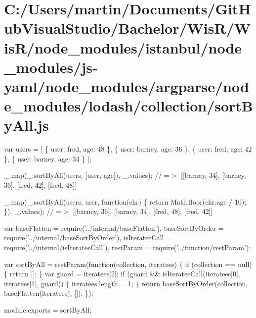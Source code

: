 \hypertarget{_c_1_2_users_2martin_2_documents_2_git_hub_visual_studio_2_bachelor_2_wis_r_2_wis_r_2node_module1c880301cba87cbea557285ccdc2d1a8}{}\section{C\+:/\+Users/martin/\+Documents/\+Git\+Hub\+Visual\+Studio/\+Bachelor/\+Wis\+R/\+Wis\+R/node\+\_\+modules/istanbul/node\+\_\+modules/js-\/yaml/node\+\_\+modules/argparse/node\+\_\+modules/lodash/collection/sort\+By\+All.\+js}
var users = \mbox{[} \{ \textquotesingle{}user\textquotesingle{}\+: \textquotesingle{}fred\textquotesingle{}, \textquotesingle{}age\textquotesingle{}\+: 48 \}, \{ \textquotesingle{}user\textquotesingle{}\+: \textquotesingle{}barney\textquotesingle{}, \textquotesingle{}age\textquotesingle{}\+: 36 \}, \{ \textquotesingle{}user\textquotesingle{}\+: \textquotesingle{}fred\textquotesingle{}, \textquotesingle{}age\textquotesingle{}\+: 42 \}, \{ \textquotesingle{}user\textquotesingle{}\+: \textquotesingle{}barney\textquotesingle{}, \textquotesingle{}age\textquotesingle{}\+: 34 \} \mbox{]};

\+\_\+.\+map(\+\_\+.\+sort\+By\+All(users, \mbox{[}\textquotesingle{}user\textquotesingle{}, \textquotesingle{}age\textquotesingle{}\mbox{]}), \+\_\+.\+values); // =$>$ \mbox{[}\mbox{[}\textquotesingle{}barney\textquotesingle{}, 34\mbox{]}, \mbox{[}\textquotesingle{}barney\textquotesingle{}, 36\mbox{]}, \mbox{[}\textquotesingle{}fred\textquotesingle{}, 42\mbox{]}, \mbox{[}\textquotesingle{}fred\textquotesingle{}, 48\mbox{]}\mbox{]}

\+\_\+.\+map(\+\_\+.\+sort\+By\+All(users, \textquotesingle{}user\textquotesingle{}, function(chr) \{ return Math.\+floor(chr.\+age / 10); \}), \+\_\+.\+values); // =$>$ \mbox{[}\mbox{[}\textquotesingle{}barney\textquotesingle{}, 36\mbox{]}, \mbox{[}\textquotesingle{}barney\textquotesingle{}, 34\mbox{]}, \mbox{[}\textquotesingle{}fred\textquotesingle{}, 48\mbox{]}, \mbox{[}\textquotesingle{}fred\textquotesingle{}, 42\mbox{]}\mbox{]}


\begin{DoxyCodeInclude}
var baseFlatten = require(\textcolor{stringliteral}{'../internal/baseFlatten'}),
    baseSortByOrder = require(\textcolor{stringliteral}{'../internal/baseSortByOrder'}),
    isIterateeCall = require(\textcolor{stringliteral}{'../internal/isIterateeCall'}),
    restParam = require(\textcolor{stringliteral}{'../function/restParam'});

var sortByAll = restParam(\textcolor{keyword}{function}(collection, iteratees) \{
  \textcolor{keywordflow}{if} (collection == null) \{
    \textcolor{keywordflow}{return} [];
  \}
  var guard = iteratees[2];
  \textcolor{keywordflow}{if} (guard && isIterateeCall(iteratees[0], iteratees[1], guard)) \{
    iteratees.length = 1;
  \}
  \textcolor{keywordflow}{return} baseSortByOrder(collection, baseFlatten(iteratees), []);
\});

module.exports = sortByAll;
\end{DoxyCodeInclude}
 